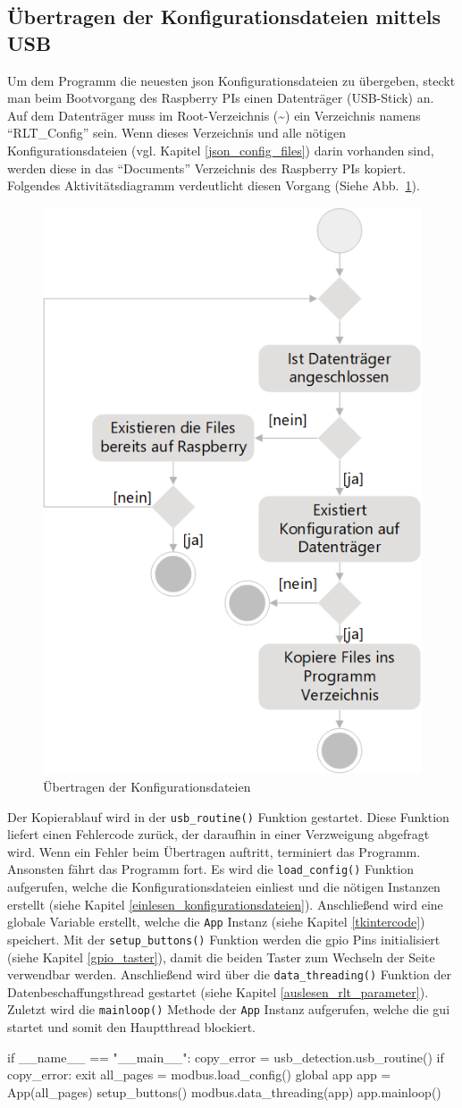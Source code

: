 \subsection{Übertragen der Konfigurationsdateien mittels USB}
Um dem Programm die neuesten \acs{json} Konfigurationsdateien zu übergeben, steckt man beim Bootvorgang des Raspberry PIs einen Datenträger (\zB USB-Stick) an. Auf dem Datenträger muss im Root-Verzeichnis (\textasciitilde) ein Verzeichnis namens \enquote{RLT\_Config} sein. Wenn dieses Verzeichnis und alle nötigen Konfigurationsdateien (vgl. Kapitel \ref{json_config_files}) darin vorhanden sind, werden diese in das \enquote{Documents} Verzeichnis des Raspberry PIs kopiert. Folgendes Aktivitätsdiagramm verdeutlicht diesen Vorgang (Siehe Abb.~\ref{fig:config_ubertragen_activity}).
\begin{figure}[H]
	\centering
	\includegraphics[width=0.4\linewidth]{Bilder/config_ubertragen_activity_diagram}
	\caption{Übertragen der Konfigurationsdateien}
	\label{fig:config_ubertragen_activity}
\end{figure}

Der Kopierablauf wird in der \lstinline{usb_routine()} Funktion gestartet. Diese Funktion liefert einen Fehlercode zurück, der daraufhin in einer Verzweigung abgefragt wird. Wenn ein Fehler beim Übertragen auftritt, terminiert das Programm. Ansonsten fährt das Programm fort. Es wird die \lstinline{load_config()} Funktion aufgerufen, welche die Konfigurationsdateien einliest und die nötigen Instanzen erstellt (siehe Kapitel \ref{einlesen_konfigurationsdateien}). Anschließend wird eine globale Variable erstellt, welche die \lstinline{App} Instanz (siehe Kapitel \ref{tkintercode}) speichert. Mit der \lstinline{setup_buttons()} Funktion werden die \acs{gpio} Pins initialisiert (siehe Kapitel \ref{gpio_taster}), damit die beiden Taster zum Wechseln der Seite verwendbar werden. Anschließend wird über die \lstinline{data_threading()} Funktion der Datenbeschaffungsthread gestartet (siehe Kapitel  \ref{auslesen_rlt_parameter}). Zuletzt wird die \lstinline{mainloop()} Methode der \lstinline{App} Instanz aufgerufen, welche die \acs{gui} startet und somit den Hauptthread blockiert.
\begin{pythoncode}
if __name__ == "__main__":
	copy_error = usb_detection.usb_routine()
	if copy_error:
		exit
	all_pages = modbus.load_config()
	global app
	app = App(all_pages)
	setup_buttons()
	modbus.data_threading(app)
	app.mainloop()	
\end{pythoncode}

